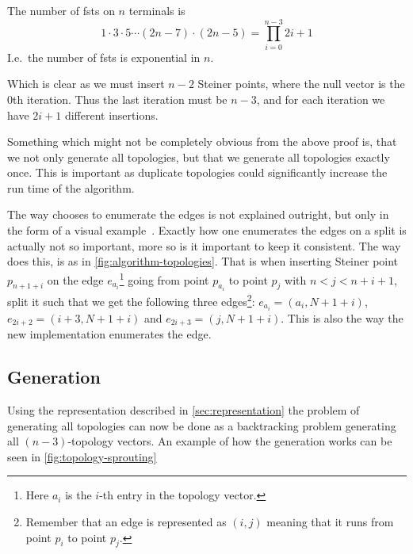 \begin{corollary}
\label{cor:number-of-fsts}
The number of \acp{fst} on $n$ terminals is
%
\[
  1 \cdot 3 \cdot 5 \cdots (2n - 7) \cdot (2n - 5) = \prod_{i=0}^{n-3} 2i+1
\]
%
I.e.\ the number of \acp{fst} is exponential in $n$.
\end{corollary}

Which is clear as we must insert $n-2$ Steiner points, where the null vector is
the $0$th iteration. Thus the last iteration must be $n-3$, and for each
iteration we have $2i+1$ different insertions.

Something which might not be completely obvious from the above proof is, that we
not only generate all topologies, but that we generate all topologies exactly
once. This is important as duplicate topologies could significantly
increase the run time of the algorithm.


The way \citeauthor{smith1992} chooses to enumerate the edges is not explained
outright, but only in the form of a visual
example~\cite[p.~143]{smith1992}. Exactly how one enumerates the edges on a
split is actually not so important, more so is it important to keep it
consistent. The way \citeauthor{smith1992} does this, is as in
\cref{fig:algorithm-topologies}. That is when inserting Steiner point
$p_{n+1+i}$ on the edge $e_{a_i}$\footnote{Here $a_i$ is the $i$-th entry in the
  topology vector.} going from point $p_{a_i}$ to point $p_j$ with
$n < j < n+i+1$, split it such that we get the following three
edges\footnote{Remember that an edge is represented as $(i,j)$ meaning that it
  runs from point $p_i$ to point $p_j$.}: $e_{a_{i}} = (a_{i}, N+1+i)$,
$ e_{2i + 2} = (i+3,N+1+i)$ and $ e_{2i + 3} = (j, N+1+i)$. This is also the way
the new implementation enumerates the edge.

\subsection{Generation}
\label{sec:generation}

Using the representation described in \cref{sec:representation} the problem of
generating all topologies can now be done as a backtracking problem generating
all $(n-3)$-topology vectors. An example of how the generation works can be seen
in \cref{fig:topology-sprouting}

